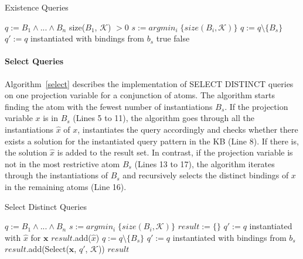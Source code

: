\begin{algorithm}
\caption{Existence Queries}
\label{exists}
\begin{algorithmic}[1]
    \State $q := B_1 \wedge ... \wedge B_n$
      \State \Return size($B_1$, $\mathcal{K}$) $> 0$
    \Else
      \State $s := argmin_i\;\{ size(B_i, \mathcal{K}) \}$
      \State $q := q \setminus \{ B_s \} $
	\State $q' := q$ instantiated with bindings from $b_s$
	    \State \Return true
	  \EndIf
      \EndFor
    \EndIf
    \State \Return false
\EndFunction
\end{algorithmic}
\end{algorithm}

\paragraph{Select Queries}
Algorithm~\ref{select} describes the implementation of SELECT DISTINCT queries on one projection variable for a conjunction of
atoms.
The algorithm starts finding the atom with the fewest number
of instantiations $B_s$. If the projection variable $x$ is in $B_s$ (Lines 5 to 11),
the algorithm goes through all the instantiations $\hat{x}$ of $x$, instantiates
the query accordingly and checks whether there exists a solution for the instantiated query pattern in the KB (Line 8).
If there is, the solution $\hat{x}$ is added to the result set. In contrast, if the projection variable is not in the most
restrictive atom $B_s$ (Lines 13 to 17), the algorithm iterates through the instantiations of $B_s$ and recursively selects the distinct
bindings of $x$ in the remaining atoms (Line 16).

\begin{algorithm}
\caption{Select Distinct Queries}
\label{select}
\begin{algorithmic}[1]
    \State $q := B_1 \wedge ... \wedge B_n$
    \State $s := argmin_i\;\{ size(B_i, \mathcal{K}) \}$
    \State $result := \lbrace \rbrace$
	\State $q' := q$ instantiated with $\hat{x}$ for $\bm{x}$
	  \State $result$.add($\hat{x}$)
	\EndIf
      \EndFor
    \Else
      \State $q := q \setminus \{ B_s\}$
      	\State $q' := q$ instantiated with bindings from $b_s$
      	\State $result$.add(Select($\bm{x}$, $q'$, $\mathcal{K}$))
      \EndFor
    \EndIf
    \State \Return $result$
\EndFunction
\end{algorithmic}
\end{algorithm}

